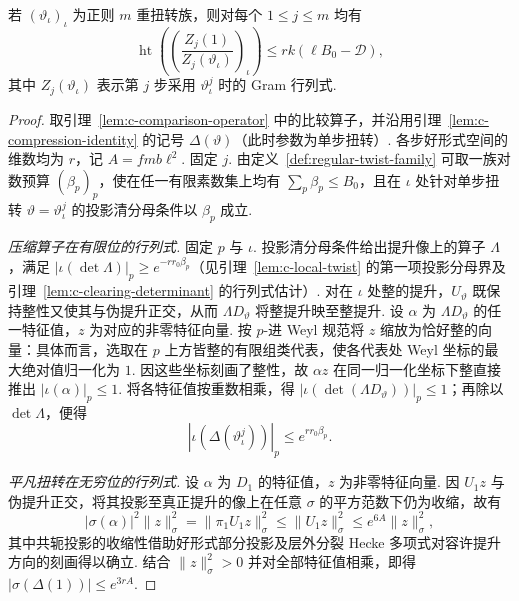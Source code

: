\begin{lemma}
\label{lem:c-single-volume-height}
\emitthmsource
若 $(\vartheta_\iota)_\iota$ 为正则 $m$ 重扭转族，则对每个 $1\le j\le m$ 均有
\begin{equation}
 \operatorname{ht}\left(\left(\frac{Z_j(1)}{Z_j(\vartheta_\iota)}\right)_\iota\right)
 \le rk(\ell B_0-\mathcal D),
\label{eq:c-single-volume}
\end{equation}
其中 $Z_j(\vartheta_\iota)$ 表示第 $j$ 步采用 $\vartheta_\iota^j$ 时的 Gram 行列式.
\end{lemma}
\begin{proof}
取引理~\ref{lem:c-comparison-operator} 中的比较算子，并沿用引理~\ref{lem:c-compression-identity} 的记号 $\Delta(\vartheta)$（此时参数为单步扭转）. 各步好形式空间的维数均为 $r$，记 $A=fmb\ell^2$. 固定 $j$. 由定义~\ref{def:regular-twist-family} 可取一族对数预算 $(\beta_p)_p$，使在任一有限素数集上均有 $\sum_p\beta_p\le B_0$，且在 $\iota$ 处针对单步扭转 $\vartheta=\vartheta_\iota^j$ 的投影清分母条件以 $\beta_p$ 成立.

\emph{压缩算子在有限位的行列式.}
固定 $p$ 与 $\iota$. 投影清分母条件给出提升像上的算子 $\Lambda$，满足 $|\iota(\det\Lambda)|_p\ge e^{-rr_0\beta_p}$（见引理~\ref{lem:c-local-twist} 的第一项投影分母界及引理~\ref{lem:c-clearing-determinant} 的行列式估计）. 对在 $\iota$ 处整的提升，$U_\vartheta$ 既保持整性又使其与伪提升正交，从而 $\Lambda D_\vartheta$ 将整提升映至整提升. 设 $\alpha$ 为 $\Lambda D_\vartheta$ 的任一特征值，$z$ 为对应的非零特征向量. 按 $p$-进 Weyl 规范将 $z$ 缩放为恰好整的向量：具体而言，选取在 $p$ 上方皆整的有限组类代表，使各代表处 Weyl 坐标的最大绝对值归一化为 $1$. 因这些坐标刻画了整性，故 $\alpha z$ 在同一归一化坐标下整直接推出 $|\iota(\alpha)|_p\le1$. 将各特征值按重数相乘，得 $|\iota(\det(\Lambda D_\vartheta))|_p\le1$；再除以 $\det\Lambda$，便得
\[
 |\iota(\Delta(\vartheta_\iota^j))|_p\le e^{rr_0\beta_p}.
\]

\emph{平凡扭转在无穷位的行列式.}
设 $\alpha$ 为 $D_1$ 的特征值，$z$ 为非零特征向量. 因 $U_1 z$ 与伪提升正交，将其投影至真正提升的像上在任意 $\sigma$ 的平方范数下仍为收缩，故有
\[
 |\sigma(\alpha)|^2\|z\|_\sigma^2
   =\|\pi_1 U_1 z\|_\sigma^2\le\|U_1 z\|_\sigma^2
   \le e^{6A}\|z\|_\sigma^2 ,
\]
其中共轭投影的收缩性借助好形式部分投影及层外分裂 Hecke 多项式对容许提升方向的刻画得以确立.
结合 $\|z\|_\sigma^2>0$ 并对全部特征值相乘，即得 $|\sigma(\Delta(1))|\le e^{3rA}$.


\end{proof}
